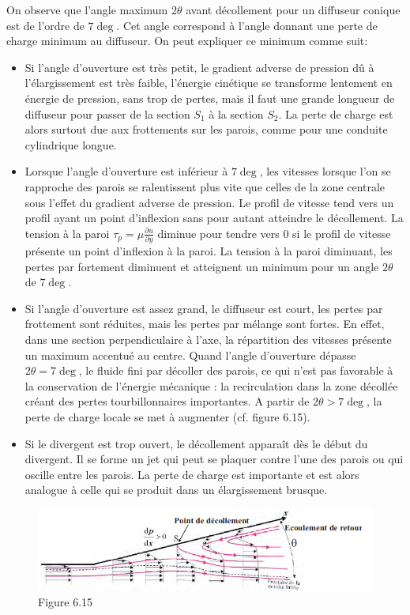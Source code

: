 On observe que l'angle maximum $2\theta$ avant décollement pour un diffuseur conique est de l'ordre de $7\deg$. Cet angle correspond à l'angle donnant une perte de charge minimum au diffuseur. On peut expliquer ce minimum comme suit: 

\begin{itemize}
\item Si l’angle d’ouverture est très petit, le gradient adverse de pression dû à l’élargissement est très faible,
l’énergie cinétique se transforme lentement en énergie de pression, sans trop de pertes, mais il faut une
grande longueur de diffuseur pour passer de la section $S_1$ à la section $S_2$. La perte de charge est alors surtout due aux frottements sur les parois, comme pour une conduite cylindrique longue.
\item Lorsque l’angle d’ouverture est inférieur à $7\deg$, les vitesses lorsque l’on se rapproche des parois se ralentissent plus vite que celles de la zone centrale sous l’effet du gradient adverse de pression. Le profil de vitesse tend vers un profil ayant un point d’inflexion sans pour autant atteindre le décollement. La tension à la paroi $\tau_p=\mu \frac{\partial u}{\partial y}$ diminue pour tendre vers 0 si le profil de vitesse présente un point d’inflexion à la paroi. La tension à la paroi diminuant, les pertes par fortement diminuent et atteignent un minimum pour un angle $2\theta$ de $7\deg$.
\item Si l’angle d’ouverture est assez grand, le diffuseur est court, les pertes par frottement sont réduites, mais les pertes par mélange sont fortes. En effet, dans une section perpendiculaire à l’axe, la répartition des vitesses présente un maximum accentué au centre. Quand l’angle d’ouverture dépasse $2\theta=7\deg$, le fluide fini par décoller des parois, ce qui n’est pas favorable à la conservation de l’énergie mécanique : la recirculation dans la zone décollée créant des pertes tourbillonnaires importantes. A partir de
$2\theta>7\deg$, la perte de charge locale se met à augmenter (cf. figure 6.15).
\item Si le divergent est trop ouvert, le décollement apparaît dès le début du divergent. Il se forme un jet qui peut se plaquer contre l’une des parois ou qui oscille entre les parois. La perte de charge est importante et est alors analogue à celle qui se produit dans un élargissement brusque.
\end{itemize}

\begin{figure}[H]
\begin{center}
\includegraphics[scale=0.40]{ch6/76.png}
\caption*{Figure 6.15}
\end{center}
\end{figure}

